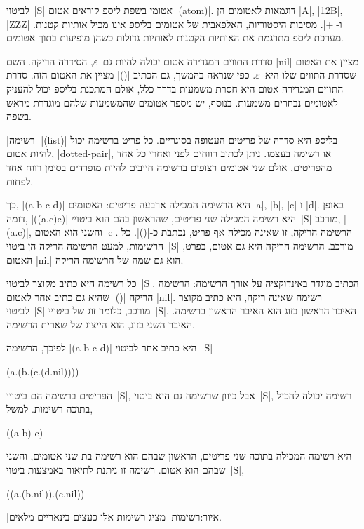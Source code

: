 לביטוי~\E|S| אטומי בשפת ליספ קוראים אטום \E|(atom)|. דוגמאות לאטומים הן \E|A|,
\E|12B|, \E|ZZZ| ו-\E|+|. מסיבות היסטוריות, האלפאבית של אטומים בליספ אינו מכיל
אותיות קטנות. מערכת ליספ מתרגמת את האותיות הקטנות לאותיות גדולות כשהן מופיעות
בתוך אטומים.

סדרת התווים המגדירה אטום יכולה להיות גם~$ε$, הסידרה הריקה. השם \E|nil| מציין את
האטום שסדרת התווים שלו היא~$ε$. כפי שנראה בהמשך, גם הכתיב \E|()| מציין את האטום
הזה. סדרת התווים המגדירה אטום היא חסרת משמעות בדרך כלל, אולם המתכנת בליספ יכול
להעניק לאטומים נבחרים משמעות. בנוסף, יש מספר אטומים שהמשמעות שלהם מוגדרת מראש
בשפה.

\ע|רשימה| \E|(list)| בליספ היא סדרה של פריטים העטופה בסוגריים. כל פריט ברשימה
יכול להיות אטום, \E|dotted-pair|, או רשימה בעצמו. ניתן לכתוב רווחים לפני ואחרי
כל אחד מהפריטים, אולם שני אטומים רצופים ברשימה חייבים להיות מופרדים בסימן רווח
אחד לפחות.

כך, \E|(a b c d)| היא הרשימה המכילה ארבעה פריטים: האטומים \E|a|, \E|b|, \E|c|
ו-\E|d|. באופן דומה, \E|((a.c)c)| היא רשימה המכילה שני פריטים, שהראשון בהם הוא
ביטויי~\E|S| מורכב, \E|(a.c)|, והשני הוא האטום \E|c|. הרשימה הריקה, זו שאינה
מכילה אף פריט, נכתבת כ-\E|()|. כל הרשימות, למעט הרשימה הריקה הן ביטוי~\E|S|
מורכב. הרשימה הריקה היא גם אטום, בפרט, האטום \E|nil| הוא גם שמה של הרשימה הריקה.

כל רשימה היא כתיב מקוצר לביטוי~\E|S|. הכתיב מוגדר באינדוקציה על אורך הרשימה:
הרשימה הריקה \E|()| שהיא גם כתיב אחר לאטום \E|nil|. רשימה שאינה ריקה, היא כתיב
מקוצר לביטוי~\E|S| מורכב, כלומר זוג של ביטויי~\E|S|. האיבר הראשון בזוג הוא
האיבר הראשון ברשימה. האיבר השני בזוג, הוא הייצוג של שארית הרשימה.

לפיכך, הרשימה \E|(a b c d)| היא כתיב אחר לביטוי~\E|S|
\begin{LISP}
(a.(b.(c.(d.nil))))
\end{LISP}

הפריטים ברשימה הם ביטויי~\E|S|, אבל כיוון שרשימה גם היא ביטוי~\E|S|, רשימה
יכולה להכיל בתוכה רשימות. למשל,
\begin{LISP}
  ((a b) c)
\end{LISP}
היא רשימה המכילה בתוכה שני פריטים, הראשון שבהם הוא רשימה בת שני אטומים, והשני
שבהם הוא אטום. רשימה זו ניתנת לתיאור באמצעות ביטוי~\E|S|,
\begin{LISP}
  ((a.(b.nil)).(c.nil))
\end{LISP}
|איור:רשימות| מציג רשימות אלו כעצים בינאריים מלאים.


